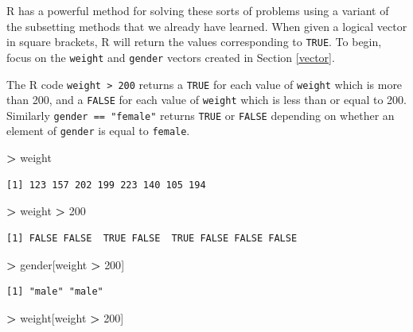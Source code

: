 \documentclass[]{krantz}
\makeatletter
\newenvironment{Shaded}{\begin{snugshade}}{\end{snugshade}}
\newcommand{\DecValTok}[1]{\textcolor[rgb]{0.06,0.06,0.06}{#1}}
\newcommand{\NormalTok}[1]{#1}
\newcommand{\OperatorTok}[1]{\textcolor[rgb]{0.43,0.43,0.43}{\textbf{#1}}}
\newcommand{\StringTok}[1]{\textcolor[rgb]{0.5,0.5,0.5}{#1}}
\newenvironment{kframe}{%
\medskip{}
\setlength{\fboxsep}{.8em}
 \def\at@end@of@kframe{}%
 \ifinner\ifhmode%
  \def\at@end@of@kframe{\end{minipage}}%
  \begin{minipage}{\columnwidth}%
 \fi\fi%
 \def\FrameCommand##1{\hskip\@totalleftmargin \hskip-\fboxsep
 \colorbox{shadecolor}{##1}\hskip-\fboxsep
     \hskip-\linewidth \hskip-\@totalleftmargin \hskip\columnwidth}%
 \MakeFramed {\advance\hsize-\width
   \@totalleftmargin\z@ \linewidth\hsize
   \@setminipage}}%
 {\par\unskip\endMakeFramed%
 \at@end@of@kframe}
\renewenvironment{Shaded}{\begin{kframe}}{\end{kframe}}
\makeatother
\begin{document}
R has a powerful method for solving these sorts of problems using a variant of the subsetting methods that we already have learned. When given a logical vector in square brackets, R will return the values corresponding to \texttt{TRUE}.
To begin, focus on the \texttt{weight} and \texttt{gender} vectors created in Section \ref{vector}.

The R code \texttt{weight\ \textgreater{}\ 200} returns a \texttt{TRUE} for each value of \texttt{weight} which is more than 200, and a \texttt{FALSE} for each value of \texttt{weight} which is less than or equal to 200. Similarly \texttt{gender\ ==\ "female"} returns \texttt{TRUE} or \texttt{FALSE} depending on whether an element of \texttt{gender} is equal to \texttt{female}.

\begin{Shaded}
\begin{Highlighting}[]
\OperatorTok{>}\StringTok{ }\NormalTok{weight}
\end{Highlighting}
\end{Shaded}

\begin{verbatim}
[1] 123 157 202 199 223 140 105 194
\end{verbatim}

\begin{Shaded}
\begin{Highlighting}[]
\OperatorTok{>}\StringTok{ }\NormalTok{weight }\OperatorTok{>}\StringTok{ }\DecValTok{200}
\end{Highlighting}
\end{Shaded}

\begin{verbatim}
[1] FALSE FALSE  TRUE FALSE  TRUE FALSE FALSE FALSE
\end{verbatim}

\begin{Shaded}
\begin{Highlighting}[]
\OperatorTok{>}\StringTok{ }\NormalTok{gender[weight }\OperatorTok{>}\StringTok{ }\DecValTok{200}\NormalTok{]}
\end{Highlighting}
\end{Shaded}

\begin{verbatim}
[1] "male" "male"
\end{verbatim}

\begin{Shaded}
\begin{Highlighting}[]
\OperatorTok{>}\StringTok{ }\NormalTok{weight[weight }\OperatorTok{>}\StringTok{ }\DecValTok{200}\NormalTok{]}
\end{Highlighting}
\end{Shaded}
\end{document}
